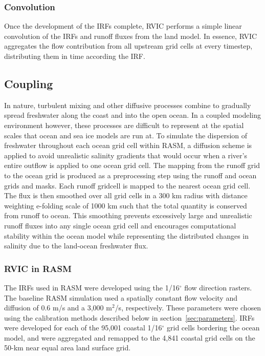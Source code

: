\documentclass[jgrga, draft]{agutex}
\begin{document}
\begin{article}
\subsubsection{Convolution}
\label{sec:convolution}

Once the development of the IRFs complete, RVIC performs a simple linear convolution of the IRFs and runoff fluxes from the land model.
In essence, RVIC aggregates the flow contribution from all upstream grid cells at every timestep, distributing them in time according the IRF.

\subsection{Coupling}
\label{sec:coupling}

In nature, turbulent mixing and other diffusive processes combine to gradually spread freshwater along the coast and into the open ocean.
In a coupled modeling environment however, these processes are difficult to represent at the spatial scales that ocean and sea ice models are run at.
To simulate the dispersion of freshwater throughout each ocean grid cell within RASM, a diffusion scheme is applied to avoid unrealistic salinity gradients that would occur when a river’s entire outflow is applied to one ocean grid cell.
The mapping from the runoff grid to the ocean grid is produced as a preprocessing step using the runoff and ocean grids and masks.
Each runoff gridcell is mapped to the nearest ocean grid cell.
The flux is then smoothed over all grid cells in a 300 km radius with distance weighting e-folding scale of 1000 km such that the total quantity is conserved from runoff to ocean.
This smoothing prevents excessively large and unrealistic runoff fluxes into any single ocean grid cell and encourages computational stability within the ocean model while representing the distributed changes in salinity due to the land-ocean freshwater flux.

\subsubsection{RVIC in RASM}

The IRFs used in RASM were developed using the \citet{Wu_2011} 1/16$^{\circ}$ flow direction rasters.
The baseline RASM simulation used a spatially constant flow velocity and diffusion of 0.6 m/s and a 3,000 m$^2$/s, respectively.
These parameters were chosen using the calibration methods described below in section~\ref{sec:parameters}.
IRFs were developed for each of the 95,001 coastal 1/16$^{\circ}$ grid cells bordering the ocean model, and were aggregated and remapped to the 4,841 coastal grid cells on the 50-km near equal area land surface grid.


\end{article}
\end{document}
